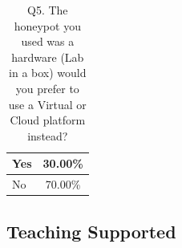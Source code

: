 \documentclass[10pt,journal]{IEEEtran}
\begin{document}
\begin{table}[ht]
  \centering
  \caption{Q5. The honeypot you used was a hardware (Lab in a box) would you prefer to use a Virtual or Cloud platform instead?}
  \label{tab:UsedBefore}
  \begin{tabular}{|l|c|}
  \hline
  Yes  & 30.00\% \\ \hline
  No   & 70.00\% \\ \hline
  \end{tabular}
\end{table}








\subsection{Teaching Supported\label{ResourceSupport}}
\end{document}
